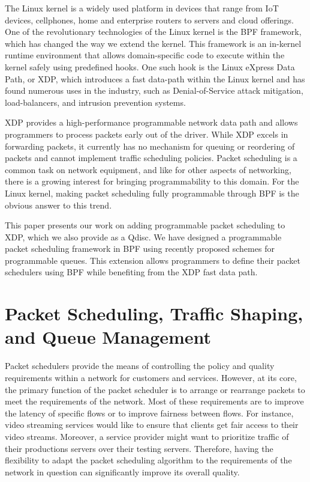 \documentclass[sigconf, nonacm]{acmart}
\begin{document}
The Linux kernel is a widely used platform in devices that range from IoT devices, cellphones, home and enterprise routers to servers and cloud offerings. One of the revolutionary technologies of the Linux kernel is the BPF framework, which has changed the way we extend the kernel. This framework is an in-kernel runtime environment that allows domain-specific code to execute within the kernel safely using predefined hooks. One such hook is the Linux eXpress Data Path\cite{hoiland2018express}, or XDP, which introduces a fast data-path within the Linux kernel and has found numerous uses in the industry, such as Denial-of-Service attack mitigation, load-balancers, and intrusion prevention systems.

XDP provides a high-performance programmable network data path and allows programmers to process packets early out of the driver. While XDP excels in forwarding packets, it currently has no mechanism for queuing or reordering of packets and cannot implement traffic scheduling policies. Packet scheduling is a common task on network equipment, and like for other aspects of networking, there is a growing interest for bringing programmability to this domain. For the Linux kernel, making packet scheduling fully programmable through BPF is the obvious answer to this trend.

This paper presents our work on adding programmable packet scheduling to XDP, which we also provide as a Qdisc. We have designed a programmable packet scheduling framework in BPF using recently proposed schemes for programmable queues. This extension allows programmers to define their packet schedulers using BPF while benefiting from the XDP fast data path.


\section{Packet Scheduling, Traffic Shaping, and Queue Management}

Packet schedulers provide the means of controlling the policy and quality requirements within a network for customers and services. However, at its core, the primary function of the packet scheduler is to arrange or rearrange packets to meet the requirements of the network. Most of these requirements are to improve the latency of specific flows or to improve fairness between flows. For instance, video streaming services would like to ensure that clients get fair access to their video streams. Moreover, a service provider might want to prioritize traffic of their productions servers over their testing servers. Therefore, having the flexibility to adapt the packet scheduling algorithm to the requirements of the network in question can significantly improve its overall quality.
\end{document}
